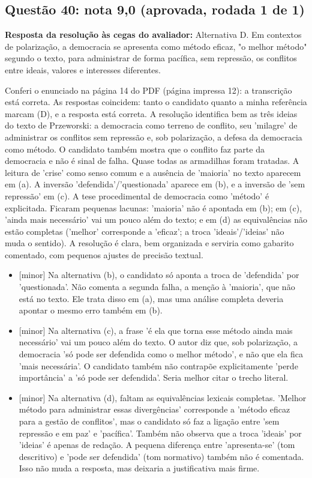 \documentclass{article}%
\begin{document}
\subsection*{Questão 40: nota 9,0 (aprovada, rodada 1 de 1)}%
\textbf{Resposta da resolução às cegas do avaliador:} Alternativa D. Em contextos de polarização, a democracia se apresenta como método eficaz, "o melhor método" segundo o texto, para administrar de forma pacífica, sem repressão, os conflitos entre ideais, valores e interesses diferentes.\par %
Conferi o enunciado na página 14 do PDF (página impressa 12): a transcrição está correta. As respostas coincidem: tanto o candidato quanto a minha referência marcam (D), e a resposta está correta. A resolução identifica bem as três ideias do texto de Przeworski: a democracia como terreno de conflito, seu 'milagre' de administrar os conflitos sem repressão e, sob polarização, a defesa da democracia como método. O candidato também mostra que o conflito faz parte da democracia e não é sinal de falha. Quase todas as armadilhas foram tratadas. A leitura de 'crise' como senso comum e a ausência de 'maioria' no texto aparecem em (a). A inversão 'defendida'/'questionada' aparece em (b), e a inversão de 'sem repressão' em (c). A tese procedimental de democracia como 'método' é explicitada. Ficaram pequenas lacunas: 'maioria' não é apontada em (b); em (c), 'ainda mais necessário' vai um pouco além do texto; e em (d) as equivalências não estão completas ('melhor' corresponde a 'eficaz'; a troca 'ideais'/'ideias' não muda o sentido). A resolução é clara, bem organizada e serviria como gabarito comentado, com pequenos ajustes de precisão textual.%
\begin{itemize}%
\item%
{[}minor{]} Na alternativa (b), o candidato só aponta a troca de 'defendida' por 'questionada'. Não comenta a segunda falha, a menção à 'maioria', que não está no texto. Ele trata disso em (a), mas uma análise completa deveria apontar o mesmo erro também em (b).%
\item%
{[}minor{]} Na alternativa (c), a frase 'é ela que torna esse método ainda mais necessário' vai um pouco além do texto. O autor diz que, sob polarização, a democracia 'só pode ser defendida como o melhor método', e não que ela fica 'mais necessária'. O candidato também não contrapõe explicitamente 'perde importância' a 'só pode ser defendida'. Seria melhor citar o trecho literal.%
\item%
{[}minor{]} Na alternativa (d), faltam as equivalências lexicais completas. 'Melhor método para administrar essas divergências' corresponde a 'método eficaz para a gestão de conflitos', mas o candidato só faz a ligação entre 'sem repressão e em paz' e 'pacífica'. Também não observa que a troca 'ideais' por 'ideias' é apenas de redação. A pequena diferença entre 'apresenta{-}se' (tom descritivo) e 'pode ser defendida' (tom normativo) também não é comentada. Isso não muda a resposta, mas deixaria a justificativa mais firme.%
\end{itemize}%
\end{document}
